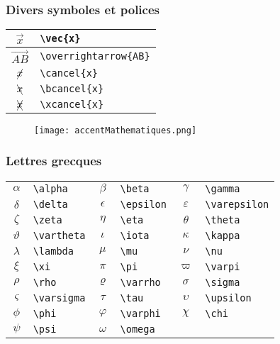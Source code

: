 \begin{frame}[containsverbatim]
    \frametitle{Divers symboles et polices}
    \begin{table}
        \centering
        \begin{tabular}{|c|l|}
            \hline
            $\vec{x}$             & \verb|\vec{x}|             \\
            \hline
            $\overrightarrow{AB}$ & \verb|\overrightarrow{AB}| \\
            \hline
            $\cancel{x}$          & \verb|\cancel{x}|          \\
            \hline
            $\bcancel{x}$         & \verb|\bcancel{x}|         \\
            \hline
            $\xcancel{x}$         & \verb|\xcancel{x}|         \\
            \hline
        \end{tabular}
    \end{table}
    \begin{figure}
        \centering
        \texttt{[image: accentMathematiques.png]}
    \end{figure}
\end{frame}

\begin{frame}[containsverbatim]
    \frametitle{Lettres grecques}
    \begin{table}
        \centering
        \begin{tabular}{|c|l||c|l||c|l|}
            \hline
            $\alpha$    & \verb|\alpha|    & $\beta$    & \verb|\beta|    & $\gamma$      & \verb|\gamma|      \\
            $\delta$    & \verb|\delta|    & $\epsilon$ & \verb|\epsilon| & $\varepsilon$ & \verb|\varepsilon| \\
            $\zeta$     & \verb|\zeta|     & $\eta$     & \verb|\eta|     & $\theta$      & \verb|\theta|      \\
            $\vartheta$ & \verb|\vartheta| & $\iota$    & \verb|\iota|    & $\kappa$      & \verb|\kappa|      \\
            $\lambda$   & \verb|\lambda|   & $\mu$      & \verb|\mu|      & $\nu$         & \verb|\nu|         \\
            $\xi$       & \verb|\xi|       & $\pi$      & \verb|\pi|      & $\varpi$      & \verb|\varpi|      \\
            $\rho$      & \verb|\rho|      & $\varrho$  & \verb|\varrho|  & $\sigma$      & \verb|\sigma|      \\
            $\varsigma$ & \verb|\varsigma| & $\tau$     & \verb|\tau|     & $\upsilon$    & \verb|\upsilon|    \\
            $\phi$      & \verb|\phi|      & $\varphi$  & \verb|\varphi|  & $\chi$        & \verb|\chi|        \\
            $\psi$      & \verb|\psi|      & $\omega$   & \verb|\omega|   &               &                    \\
            \hline
        \end{tabular}
    \end{table}
\end{frame}

